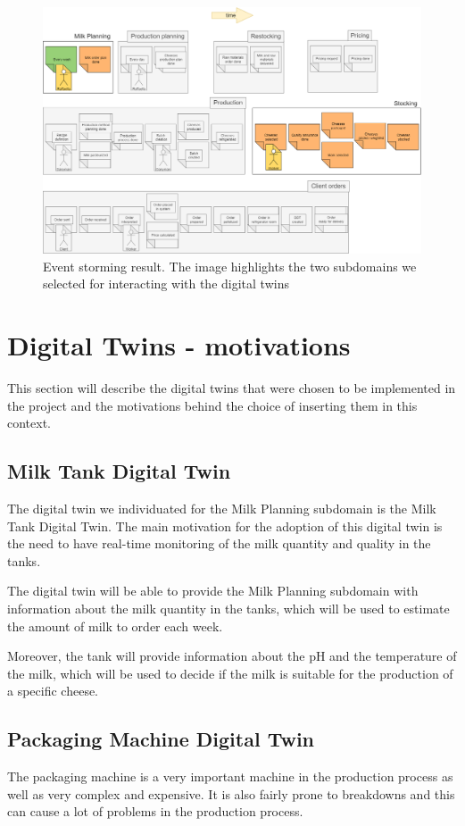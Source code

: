 \begin{figure}[H]
    \centering
    \includegraphics[width=\textwidth]{img/event-storming.png}
    \caption{Event storming result. The image highlights the two subdomains we selected for interacting with the digital twins}
    \label{img:event-storming}
\end{figure}

\section{Digital Twins - motivations}\label{sec:dt-motivations}
This section will describe the digital twins that were chosen to be implemented in the project and the motivations behind the choice of inserting them in this context.

\subsection{Milk Tank Digital Twin}
The digital twin we individuated for the Milk Planning subdomain is the Milk Tank Digital Twin.
The main motivation for the adoption of this digital twin is the need to have real-time monitoring of the milk quantity and quality in the tanks.

The digital twin will be able to provide the Milk Planning subdomain with information about the milk quantity in the tanks, which will be used to estimate the amount of milk to order each week.

Moreover, the tank will provide information about the pH and the temperature of the milk, which will be used to decide if the milk is suitable for the production of a specific cheese.

\subsection{Packaging Machine Digital Twin}
The packaging machine is a very important machine in the production process as well as very complex and expensive.
It is also fairly prone to breakdowns and this can cause a lot of problems in the production process.

